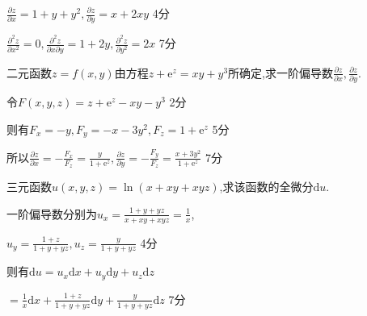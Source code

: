 \documentclass{NBUTExam}
\renewcommand{\d}{\mathrm{d}}
\newcommand{\e}{\mathrm{e}}
\newcommand{\dis}{\displaystyle}
\begin{document}
\begin{solution}
$\dis \frac{\partial z}{\partial x}=1+y+y^2,\frac{\partial z}{\partial y}=x+2xy$
 \dotfill 4分 \par
\vspace{0.5em}

$\dis \frac{\partial ^2z}{\partial x^2}=0,\frac{\partial ^2z}{\partial x\partial y}=1+2y,\frac{\partial ^2z}{\partial y^2}=2x$
 \dotfill 7分 \par
\end{solution}
\vspace{12em}
\begin{problem}
二元函数$z=f(x,y)$由方程$z+\e^z=xy+y^3$所确定,求一阶偏导数$\dis \frac{\partial z}{\partial x},\frac{\partial z}{\partial y}$.
\end{problem}
\vspace{0.5em}
\begin{solution}
令$F(x,y,z)=z+\e^z-xy-y^3$
 \dotfill 2分 \par
\vspace{0.5em}

则有$F_x=-y,F_y=-x-3y^2,F_z=1+\e^z$
 \dotfill 5分 \par
\vspace{0.5em}

所以$\dis \frac{\partial z}{\partial x}=-\frac{F_x}{F_z}=\frac{y}{1+\e^z},\frac{\partial z}{\partial y}=-\frac{F_y}{F_z}=\frac{x+3y^2}{1+\e^z}$
 \dotfill 7分 \par
\end{solution}

\vspace{12em}
\begin{problem}
三元函数$u(x,y,z)=\ln(x+xy+xyz)$,求该函数的全微分$\d u$.
\end{problem}
\vspace{1em}
\begin{solution}
一阶偏导数分别为$\dis u_x=\frac{1+y+yz}{x+xy+xyz}=\frac{1}{x}$,\par
$\dis u_y=\frac{1+z}{1+y+yz},u_z=\frac{y}{1+y+yz}$
 \dotfill 4分 \par
\vspace{0.5em}

则有$\dis \d u=u_x\d x+u_y\d y+u_z\d z$\par 
\vspace{0.5em}
\qquad \qquad $\dis =\frac{1}{x}\d x+\frac{1+z}{1+y+yz}\d y+\frac{y}{1+y+yz}\d z$
 \dotfill 7分 \par
\end{solution}
\end{document}
